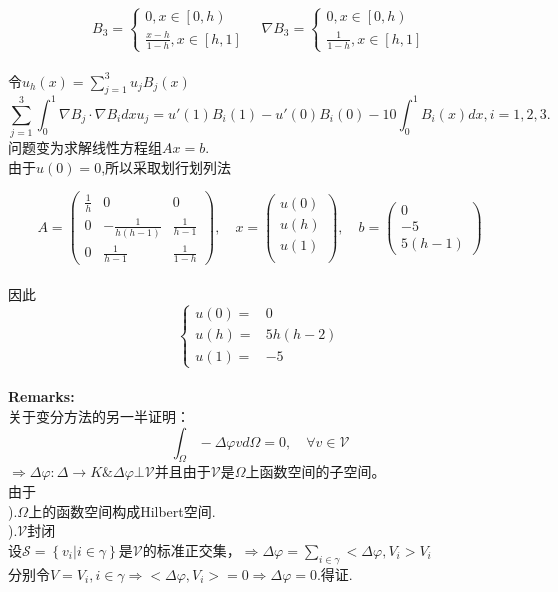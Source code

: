 \documentclass[a4paper,11pt,UTF8]{article}%
\theoremstyle{plain}
\begin{document}
\indent 
$$B_3=\left\{
\begin{aligned}
	0,x\in\left[0,h\right)\\
	\frac{x-h}{1-h},x\in \left[h,1\right]
\end{aligned}		
\right.\quad
\nabla B_3=\left\{
\begin{aligned}
	0,x\in\left[0,h\right)\\
	\frac{1}{1-h},x\in \left[h,1\right]
\end{aligned}\right.$$\\
令$u_h\left(x\right)=\sum_{j=1}^{3}u_jB_j\left(x\right)$\\
$$\sum_{j=1}^{3}\int_{0}^{1}\nabla B_j\cdot\nabla B_idxu_j=u'\left(1\right)B_i\left(1\right)-u'\left(0\right)B_i\left(0\right)-10\int_{0}^{1}B_i\left(x\right)dx,i=1,2,3.$$
问题变为求解线性方程组$Ax=b$.\\
由于$u\left(0\right)=0$,所以采取划行划列法

$$A=\begin{pmatrix}
 \frac{1}{h}&0&0\\
 0&-\frac{1}{h\left(h-1\right)}&\frac{1}{h-1}\\
 0&\frac{1}{h-1}&\frac{1}{1-h}
\end{pmatrix},\quad
x=\begin{pmatrix}
	u\left(0\right)\\
	u\left(h\right)\\
	u\left(1\right)\\
\end{pmatrix},
\quad b=\begin{pmatrix}
	0\\
	-5\\
	5\left(h-1\right)
\end{pmatrix}$$\\
因此$$\left\{
\begin{aligned}
	u\left(0\right)=&0\\
	u\left(h\right)=&5h\left(h-2\right)\\
	u\left(1\right)=&-5
\end{aligned}\right.$$\\
\textbf{Remarks:}\\
关于变分方法的另一半证明：\\
$$\int_{\Omega}-\Delta \varphi vd\Omega=0 , \quad \forall v\in \mathcal{V}$$
$\Rightarrow \Delta \varphi:\Delta\rightarrow K \& \Delta \varphi \bot \mathcal{V}$并且由于$\mathcal{V}$是$\Omega$上函数空间的子空间。\\
由于\\
\indent {}).$\Omega$上的函数空间构成Hilbert空间.\\
\indent {}).$\mathcal{V}$封闭\\
设$\mathcal{S}=\left\{v_i| i\in \gamma \right\}$是$\mathcal{V}$的标准正交集，$\Rightarrow\Delta\varphi=\sum_{i\in \gamma }<\Delta\varphi ,V_i>V_i$\\
分别令$V=V_i,i\in \gamma $$\Rightarrow<\Delta\varphi,V_i>=0$$\Rightarrow\Delta \varphi =0$.得证.
\end{document}
